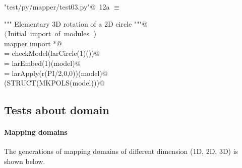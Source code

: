 \documentclass[11pt,oneside]{article}	%
\begin{document}
\begin{flushleft} \small \label{scrap24}
\protect{}\verb@"test/py/mapper/test03.py"@\nobreak\ {\footnotesize 12a }$\equiv$
\vspace{-1ex}
\begin{list}{}{} \item
\mbox{}\verb@""" Elementary 3D rotation of a 2D circle """@\\
\mbox{}\verb@@\hbox{$\langle\,$Initial import of modules\nobreak\ {\footnotesize {}}$\,\rangle$}\verb@@\\
\mbox{}\verb@from mapper import *@\\
\mbox{}\verb@model = checkModel(larCircle(1)())@\\
\mbox{}\verb@model = larEmbed(1)(model)@\\
\mbox{}\verb@model = larApply(r(PI/2,0,0))(model)@\\
\mbox{}\verb@VIEW(STRUCT(MKPOLS(model)))@\\
\mbox{}\verb@@{\NWsep}
\end{list}
\vspace{-2ex}
\end{flushleft}




\subsection{Tests about domain}

\paragraph{Mapping domains}
The generations of mapping domains of different dimension (1D, 2D, 3D) is shown below.
	
\end{document}
